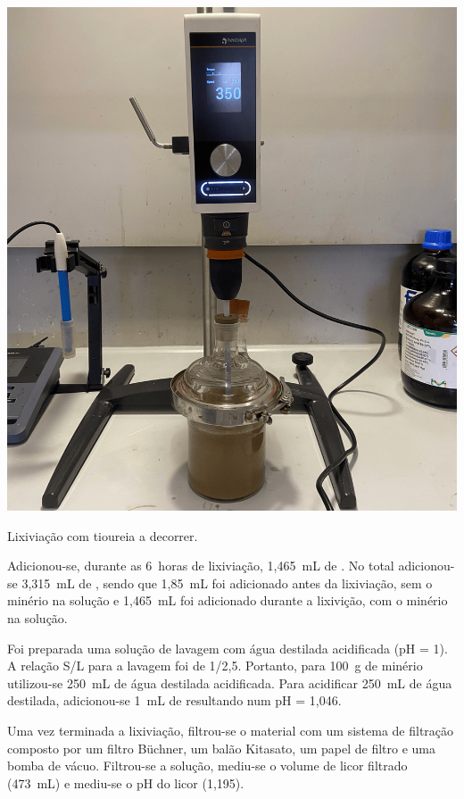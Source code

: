 \begin{marginfigure}
    \centering
    \includegraphics[width=0.9\linewidth]{figures/Lixiviação - Tioureia.png}
    \caption{Lixiviação com tioureia a decorrer.}
    \label{fig:lix-tioureia-a-decorrer}
\end{marginfigure}

Adicionou-se, durante as 6~horas de lixiviação, 1,465~mL de \acsul{}.
No total adicionou-se 3,315~mL de \acsul{}, sendo que 1,85~mL foi adicionado antes da lixiviação, sem o minério na solução e 1,465~mL foi adicionado durante a lixivição, com o minério na solução.

Foi preparada uma solução de lavagem com água destilada acidificada (pH = 1).
A relação S/L para a lavagem foi de 1/2,5. 
Portanto, para 100~g de minério utilizou-se 250~mL de água destilada acidificada.
Para acidificar 250~mL de água destilada, adicionou-se 1~mL de \acsul{} resultando num pH = 1,046.

Uma vez terminada a lixiviação, filtrou-se o material com um sistema de filtração composto por um filtro Büchner, um balão Kitasato, um papel de filtro e uma bomba de vácuo. 
Filtrou-se a solução, mediu-se o volume de licor filtrado (473~mL) e mediu-se o pH do licor (1,195).

